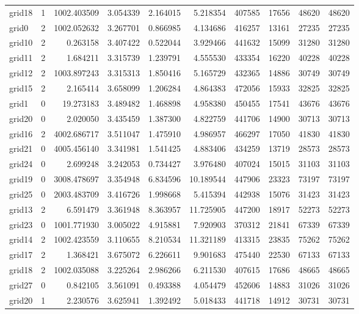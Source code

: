 \documentclass[../../../thesis.tex]{subfiles}
\begin{document}
\begin{longtable}{|l|r|r|r|r|r|r|r|r|r|}
grid18 & 1 & 1002.403509 & 3.054339 & 2.164015 & 5.218354 & 407585 & 17656 & 48620 & 48620 \\
grid0 & 2 & 1002.052632 & 3.267701 & 0.866985 & 4.134686 & 416257 & 13161 & 27235 & 27235 \\
grid10 & 2 & 0.263158 & 3.407422 & 0.522044 & 3.929466 & 441632 & 15099 & 31280 & 31280 \\
grid11 & 2 & 1.684211 & 3.315739 & 1.239791 & 4.555530 & 433354 & 16220 & 40228 & 40228 \\
grid12 & 2 & 1003.897243 & 3.315313 & 1.850416 & 5.165729 & 432365 & 14886 & 30749 & 30749 \\
grid15 & 2 & 2.165414 & 3.658099 & 1.206284 & 4.864383 & 472056 & 15933 & 32825 & 32825 \\
grid1 & 0 & 19.273183 & 3.489482 & 1.468898 & 4.958380 & 450455 & 17541 & 43676 & 43676 \\
grid20 & 0 & 2.020050 & 3.435459 & 1.387300 & 4.822759 & 441706 & 14900 & 30713 & 30713 \\
grid16 & 2 & 4002.686717 & 3.511047 & 1.475910 & 4.986957 & 466297 & 17050 & 41830 & 41830 \\
grid21 & 0 & 4005.456140 & 3.341981 & 1.541425 & 4.883406 & 434259 & 13719 & 28573 & 28573 \\
grid24 & 0 & 2.699248 & 3.242053 & 0.734427 & 3.976480 & 407024 & 15015 & 31103 & 31103 \\
grid19 & 0 & 3008.478697 & 3.354948 & 6.834596 & 10.189544 & 447906 & 23323 & 73197 & 73197 \\
grid25 & 0 & 2003.483709 & 3.416726 & 1.998668 & 5.415394 & 442938 & 15076 & 31423 & 31423 \\
grid13 & 2 & 6.591479 & 3.361948 & 8.363957 & 11.725905 & 447200 & 18917 & 52273 & 52273 \\
grid23 & 0 & 1001.771930 & 3.005022 & 4.915881 & 7.920903 & 370312 & 21841 & 67339 & 67339 \\
grid14 & 2 & 1002.423559 & 3.110655 & 8.210534 & 11.321189 & 413315 & 23835 & 75262 & 75262 \\
grid17 & 2 & 1.368421 & 3.675072 & 6.226611 & 9.901683 & 475440 & 22530 & 67133 & 67133 \\
grid18 & 2 & 1002.035088 & 3.225264 & 2.986266 & 6.211530 & 407615 & 17686 & 48665 & 48665 \\
grid27 & 0 & 0.842105 & 3.561091 & 0.493388 & 4.054479 & 452606 & 14883 & 31026 & 31026 \\
grid20 & 1 & 2.230576 & 3.625941 & 1.392492 & 5.018433 & 441718 & 14912 & 30731 & 30731 \\

\end{longtable}
\end{document}
